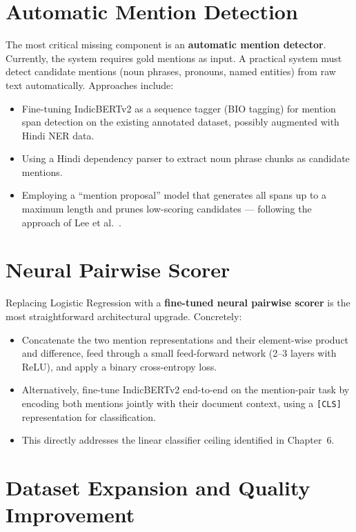 \documentclass[12pt,a4paper]{report}
\begin{document}
\section{Automatic Mention Detection}

The most critical missing component is an \textbf{automatic mention detector}. Currently, the system requires gold mentions as input. A practical system must detect candidate mentions (noun phrases, pronouns, named entities) from raw text automatically. Approaches include:

\begin{itemize}
    \item Fine-tuning IndicBERTv2 as a sequence tagger (BIO tagging) for mention span detection on the existing annotated dataset, possibly augmented with Hindi NER data.
    \item Using a Hindi dependency parser to extract noun phrase chunks as candidate mentions.
    \item Employing a ``mention proposal'' model that generates all spans up to a maximum length and prunes low-scoring candidates --- following the approach of Lee et al.\ \cite{lee2017end}.
\end{itemize}

\section{Neural Pairwise Scorer}

Replacing Logistic Regression with a \textbf{fine-tuned neural pairwise scorer} is the most straightforward architectural upgrade. Concretely:

\begin{itemize}
    \item Concatenate the two mention representations and their element-wise product and difference, feed through a small feed-forward network (2--3 layers with ReLU), and apply a binary cross-entropy loss.
    \item Alternatively, fine-tune IndicBERTv2 end-to-end on the mention-pair task by encoding both mentions jointly with their document context, using a \texttt{[CLS]} representation for classification.
    \item This directly addresses the linear classifier ceiling identified in Chapter~6.
\end{itemize}

\section{Dataset Expansion and Quality Improvement}
\end{document}
